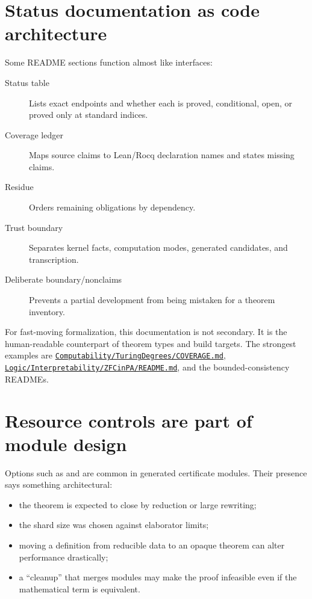 \documentclass[
  10pt,
  a4paper,
  twoside,
  open=any,
  parskip=half,
  headings=big
]{scrreprt}
\newcommand{\CommitFull}{675d0a2ff0fc624fba199e006049016ba806f40a}
\newcommand{\RepoBlobBase}{https://github.com/VladimirReshetnikov/ProveIt/blob/\CommitFull/}
\newcommand{\RepoFile}[1]{%
  \href{\RepoBlobBase\detokenize{#1}}{\nolinkurl{#1}}}
\newcommand{\code}[1]{\texttt{\detokenize{#1}}}
\begin{document}
\section{Status documentation as code architecture}

Some README sections function almost like interfaces:

\begin{description}
  \item[Status table] Lists exact endpoints and whether each is proved,
        conditional, open, or proved only at standard indices.
  \item[Coverage ledger] Maps source claims to Lean/Rocq declaration names and
        states missing claims.
  \item[Residue] Orders remaining obligations by dependency.
  \item[Trust boundary] Separates kernel facts, computation modes, generated
        candidates, and transcription.
  \item[Deliberate boundary/nonclaims] Prevents a partial development from
        being mistaken for a theorem inventory.
\end{description}

For fast-moving formalization, this documentation is not secondary.  It is the
human-readable counterpart of theorem types and build targets.  The strongest
examples are \RepoFile{Computability/TuringDegrees/COVERAGE.md},
\RepoFile{Logic/Interpretability/ZFCinPA/README.md}, and the bounded-consistency
READMEs.

\section{Resource controls are part of module design}

Options such as \code{maxHeartbeats} and \code{maxRecDepth} are common in
generated certificate modules.  Their presence says something architectural:

\begin{itemize}
  \item the theorem is expected to close by reduction or large rewriting;
  \item the shard size was chosen against elaborator limits;
  \item moving a definition from reducible data to an opaque theorem can alter
        performance drastically;
  \item a ``cleanup'' that merges modules may make the proof infeasible even
        if the mathematical term is equivalent.
\end{itemize}
\end{document}
